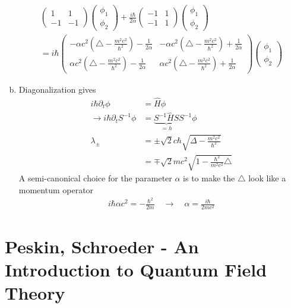 \documentclass[10pt,a4paper]{book}
\theoremstyle{definition}
\begin{document}
\begin{enumerate}[(a)]
\begin{align}
\begin{pmatrix}
 1 &  1 \\
-1 & -1 
\end{pmatrix}\begin{pmatrix}
\phi_1 \\
\phi_2 
\end{pmatrix}
+\frac{i\hbar}{2\alpha}
\begin{pmatrix}
-1 &  1 \\
-1 &  1 
\end{pmatrix}
\begin{pmatrix}
\phi_1 \\
\phi_2 
\end{pmatrix}\\
=i\hbar\begin{pmatrix}
-\alpha c^2\left(\triangle-\frac{m^2c^2}{\hbar^2}\right)-\frac{1}{2\alpha} &  -\alpha c^2\left(\triangle-\frac{m^2c^2}{\hbar^2}\right)+\frac{1}{2\alpha} \\
\alpha c^2\left(\triangle-\frac{m^2c^2}{\hbar^2}\right)-\frac{1}{2\alpha} &  \alpha c^2\left(\triangle-\frac{m^2c^2}{\hbar^2}\right)+\frac{1}{2\alpha}
\end{pmatrix}
\begin{pmatrix}
\phi_1  \\
\phi_2  
\end{pmatrix}
\end{align}
\item Diagonalization gives
\begin{align}
    i\hbar\partial_t\phi&=\hat{H}\phi\\
    \rightarrow i\hbar\partial_tS^{-1}\phi&=\underbrace{S^{-1}\hat{H}S}_{=h}S^{-1}\phi\\
    \lambda_\pm&=\pm\sqrt{2}c\hbar\sqrt{\Delta-\frac{m^2c^2}{\hbar^2}}\\
    &=\mp\sqrt{2}mc^2\sqrt{1-\frac{\hbar^2}{m^2c^2}\triangle}
\end{align}
A semi-canonical choice for the parameter $\alpha$ is to make the $\triangle$ look like a momentum operator
\begin{align}
    i\hbar\alpha c^2=-\frac{\hbar^2}{2m}\quad\rightarrow\quad\alpha=\frac{i\hbar}{2mc^2}
\end{align}
\end{enumerate}

\section{{\sc Peskin, Schroeder} - An Introduction to Quantum Field Theory}
\end{document}
